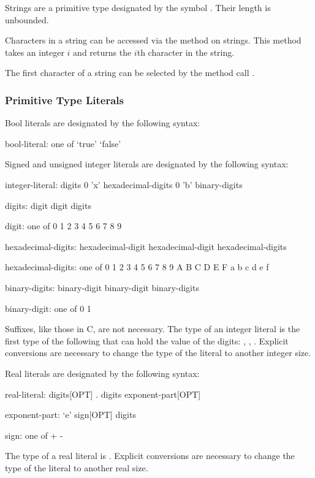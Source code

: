 Strings are a primitive type designated by the symbol .
Their length is unbounded.

Characters in a string can be accessed via the  method
on strings.  This method takes an integer $i$ and returns the $i$th
character in the string.
\begin{example}
The first character of a string  can be selected by the method
call .
\end{example}

\subsubsection{Primitive Type Literals}
\label{Primitive_Type_Literals}

Bool literals are designated by the following syntax:
\begin{syntax}
bool-literal: one of
  `true' `false'
\end{syntax}

Signed and unsigned integer literals are designated by the following
syntax:
\begin{syntax}
integer-literal:
  digits
  0 'x' hexadecimal-digits
  0 'b' binary-digits

digits:
  digit
  digit digits

digit: one of
  0 1 2 3 4 5 6 7 8 9

hexadecimal-digits:
  hexadecimal-digit
  hexadecimal-digit hexadecimal-digits

hexadecimal-digits: one of
  0 1 2 3 4 5 6 7 8 9 A B C D E F a b c d e f

binary-digits:
  binary-digit
  binary-digit binary-digits

binary-digit: one of
  0 1
\end{syntax}
Suffixes, like those in C, are not necessary.  The type of an integer
literal is the first type of the following that can hold the value of
the digits: , , .  Explicit
conversions are necessary to change the type of the literal to another
integer size.

Real literals are designated by the following syntax:
\begin{syntax}
real-literal:
  digits[OPT] . digits exponent-part[OPT]

exponent-part:
  `e' sign[OPT] digits

sign: one of
  + -
\end{syntax}
The type of a real literal is .  Explicit conversions are
necessary to change the type of the literal to another real
size.

